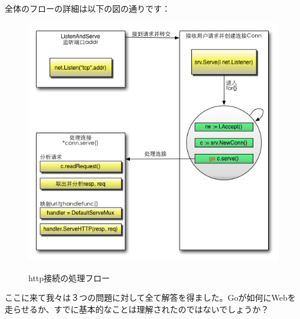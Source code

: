 全体のフローの詳細は以下の図の通りです：

\begin{figure}[H]
  \includegraphics[width=14cm]{3.3.illustrator.png}
   \label{図3.10}
   \caption{http接続の処理フロー}
\end{figure}

ここに来て我々は３つの問題に対して全て解答を得ました。Goが如何にWebを走らせるか、すでに基本的なことは理解されたのではないでしょうか？
